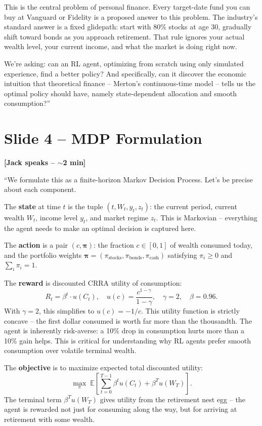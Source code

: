 \documentclass[11pt, letterpaper]{article}
\begin{document}
This is the central problem of personal finance. Every target-date fund you can buy at Vanguard or Fidelity is a proposed answer to this problem. The industry's standard answer is a fixed glidepath: start with 80\% stocks at age 30, gradually shift toward bonds as you approach retirement. That rule ignores your actual wealth level, your current income, and what the market is doing right now.

We're asking: can an RL agent, optimizing from scratch using only simulated experience, find a better policy? And specifically, can it discover the economic intuition that theoretical finance -- Merton's continuous-time model -- tells us the optimal policy should have, namely state-dependent allocation and smooth consumption?''

\section{Slide 4 -- MDP Formulation}

\textbf{[Jack speaks -- $\sim$2 min]}

``We formulate this as a finite-horizon Markov Decision Process. Let's be precise about each component.

The \textbf{state} at time $t$ is the tuple $(t, W_t, y_t, z_t)$: the current period, current wealth $W_t$, income level $y_t$, and market regime $z_t$. This is Markovian -- everything the agent needs to make an optimal decision is captured here.

The \textbf{action} is a pair $(c, \boldsymbol{\pi})$: the fraction $c \in [0,1]$ of wealth consumed today, and the portfolio weights $\boldsymbol{\pi} = (\pi_\text{stocks}, \pi_\text{bonds}, \pi_\text{cash})$ satisfying $\pi_i \geq 0$ and $\sum_i \pi_i = 1$.

The \textbf{reward} is discounted CRRA utility of consumption:
\[
R_t = \beta^t \cdot u(C_t), \quad u(c) = \frac{c^{1-\gamma}}{1-\gamma}, \quad \gamma = 2, \quad \beta = 0.96.
\]
With $\gamma = 2$, this simplifies to $u(c) = -1/c$. This utility function is strictly concave -- the first dollar consumed is worth far more than the thousandth. The agent is inherently risk-averse: a 10\% drop in consumption hurts more than a 10\% gain helps. This is critical for understanding why RL agents prefer smooth consumption over volatile terminal wealth.

The \textbf{objective} is to maximize expected total discounted utility:
\[
\max_{\pi} \; \mathbb{E}\!\left[\sum_{t=0}^{T-1} \beta^t u(C_t) + \beta^T u(W_T)\right].
\]
The terminal term $\beta^T u(W_T)$ gives utility from the retirement nest egg -- the agent is rewarded not just for consuming along the way, but for arriving at retirement with some wealth.
\end{document}
